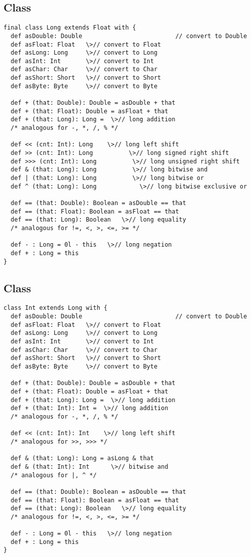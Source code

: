 \documentclass[a4paper,12pt,twoside,titlepage]{book}
\begin{document}
\subsection{Class }

\begin{lstlisting}
final class Long extends Float with {
  def asDouble: Double                          // convert to Double
  def asFloat: Float   \>// convert to Float
  def asLong: Long     \>// convert to Long
  def asInt: Int       \>// convert to Int
  def asChar: Char     \>// convert to Char
  def asShort: Short   \>// convert to Short
  def asByte: Byte     \>// convert to Byte

  def + (that: Double): Double = asDouble + that
  def + (that: Float): Double = asFloat + that
  def + (that: Long): Long =  \>// long addition
  /* analogous for -, *, /, % */

  def << (cnt: Int): Long    \>// long left shift
  def >> (cnt: Int): Long          \>// long signed right shift
  def >>> (cnt: Int): Long          \>// long unsigned right shift
  def & (that: Long): Long          \>// long bitwise and
  def | (that: Long): Long          \>// long bitwise or
  def ^ (that: Long): Long            \>// long bitwise exclusive or

  def == (that: Double): Boolean = asDouble == that
  def == (that: Float): Boolean = asFloat == that
  def == (that: Long): Boolean   \>// long equality
  /* analogous for !=, <, >, <=, >= */

  def - : Long = 0l - this   \>// long negation
  def + : Long = this
}
\end{lstlisting}


\subsection{Class }

\begin{lstlisting}
class Int extends Long with {
  def asDouble: Double                          // convert to Double
  def asFloat: Float   \>// convert to Float
  def asLong: Long     \>// convert to Long
  def asInt: Int       \>// convert to Int
  def asChar: Char     \>// convert to Char
  def asShort: Short   \>// convert to Short
  def asByte: Byte     \>// convert to Byte

  def + (that: Double): Double = asDouble + that
  def + (that: Float): Double = asFloat + that
  def + (that: Long): Long =  \>// long addition
  def + (that: Int): Int =  \>// long addition
  /* analogous for -, *, /, % */

  def << (cnt: Int): Int    \>// long left shift
  /* analogous for >>, >>> */

  def & (that: Long): Long = asLong & that
  def & (that: Int): Int      \>// bitwise and
  /* analogous for |, ^ */

  def == (that: Double): Boolean = asDouble == that
  def == (that: Float): Boolean = asFloat == that
  def == (that: Long): Boolean   \>// long equality
  /* analogous for !=, <, >, <=, >= */

  def - : Long = 0l - this   \>// long negation
  def + : Long = this
}
\end{lstlisting}
\end{document}
